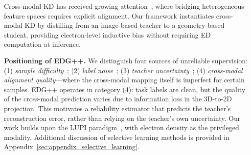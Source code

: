 Cross-modal KD has received growing attention~\cite{huo2024c2kd}, where bridging heterogeneous feature spaces requires explicit alignment. Our framework instantiates cross-modal KD by distilling from an image-based teacher to a geometry-based student, providing electron-level inductive bias without requiring ED computation at inference.

\textbf{Positioning of EDG++.} We distinguish four sources of unreliable supervision: (1) \emph{sample difficulty}~\cite{bengio2009curriculum,kumar2010self}; (2) \emph{label noise}~\cite{han2018co,song2022learning}; (3) \emph{teacher uncertainty}~\cite{park2024selkd,shi2025selkd}; (4) \emph{cross-modal alignment quality}---where the cross-modal mapping itself is imperfect for certain samples. EDG++ operates in category (4): task labels are clean, but the quality of the cross-modal prediction varies due to information loss in the 3D-to-2D projection. This motivates a reliability estimator that predicts the teacher's reconstruction error, rather than relying on the teacher's own uncertainty. Our work builds upon the LUPI paradigm~\cite{vapnik2009new,lopez2016unifying}, with electron density as the privileged modality. Additional discussion of selective learning methods is provided in Appendix~\ref{sec:appendix_selective_learning}.
